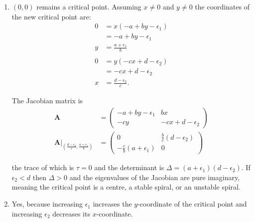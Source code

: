 \documentclass{article}
\begin{document}
\setcounter{subsubsection}{8}
\subsubsection{}

\begin{enumerate}
  \item $(0, 0)$ remains a critical point. Assuming $x \ne 0$ and $y \ne 0$ the coordinates of the new critical point are: \begin{align*}
          0 & = x (-a + b y - \epsilon_1) \\
            & = -a + b y - \epsilon_1     \\
          y & = \frac{a + \epsilon_1}{b}  \\ \\
          0 & = y (-c x + d - \epsilon_2) \\
            & = -c x + d - \epsilon_2     \\
          x & = \frac{d - \epsilon_2}{c}.
        \end{align*}

        The Jacobian matrix is \begin{align*}
          \mathbf{A}                                                                                    & = \begin{pmatrix}
                                                                                                              -a + b y - \epsilon_1 & b x                   \\
                                                                                                              -c y                  & -c x + d - \epsilon_2
                                                                                                            \end{pmatrix}                \\
          \left. \mathbf{A} \right|_{\left( \frac{d - \epsilon_2}{c}, \frac{a + \epsilon_1}{b} \right)} & = \begin{pmatrix}
                                                                                                              0                             & \frac{b}{c} (d - \epsilon_2) \\
                                                                                                              -\frac{c}{b} (a + \epsilon_1) & 0
                                                                                                            \end{pmatrix}
        \end{align*}

        the trace of which is $\tau = 0$ and the determinant is $\Delta = (a + \epsilon_1) (d - \epsilon_2)$. If $\epsilon_2 < d$ then $\Delta > 0$ and the eigenvalues of the Jacobian are pure imaginary, meaning the critical point is a centre, a stable spiral, or an unstable spiral.

  \item Yes, because increasing $\epsilon_1$ increases the $y$-coordinate of the critical point and increasing $\epsilon_2$ decreases its $x$-coordinate.
\end{enumerate}
\end{document}
